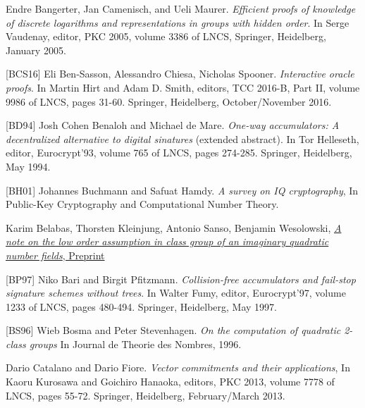 \documentclass[11pt, lettersize, notitlepage, leqno, footskip=0.6cm]{article}
\newcommand{\noin}{\noindent}
\numberwithin{equation}{section}
\begin{document}
\noin [BCM05] Endre Bangerter, Jan Camenisch, and Ueli Maurer. \textit{Efficient proofs of knowledge of discrete logarithms and representations in groups with hidden order}. In Serge Vaudenay, editor, PKC 2005, volume 3386 of LNCS, Springer, Heidelberg, January 2005.\vspace{0.1cm}

\noin \hypertarget{BCS16}{[BCS16]} Eli Ben-Sasson, Alessandro Chiesa, Nicholas Spooner. \textit{Interactive oracle proofs}. In Martin Hirt and Adam D. Smith, editors, TCC 2016-B, Part II, volume 9986 of LNCS, pages 31-60. Springer, Heidelberg,
October/November 2016.\vspace{0.1cm}

\noin \hypertarget{BD94}{[BD94]} Josh Cohen Benaloh and Michael de Mare. \textit{One-way accumulators: A decentralized alternative to digital sinatures} (extended abstract). In Tor Helleseth, editor, Eurocrypt'93, volume 765 of LNCS, pages 274-285. Springer, Heidelberg, May 1994.\vspace{0.1cm}

\noin \hypertarget{BH01}{[BH01]} Johannes Buchmann and Safuat Hamdy. \textit{A survey on IQ cryptography}, In Public-Key Cryptography and Computational Number Theory. \vspace{0.1cm}

\noin [BKSW20] Karim Belabas, Thorsten Kleinjung, Antonio Sanso, Benjamin Wesolowski, \href{https://eprint.iacr.org/2020/1310}{\textit{A note on the low order assumption in class group of an imaginary quadratic number fields}, Preprint} \vspace{0.1cm}

\noin \hypertarget{BP97}{[BP97]} Niko Bari and Birgit Pfitzmann. \textit{Collision-free accumulators and fail-stop signature schemes without trees}. In Walter Fumy, editor, Eurocrypt'97, volume 1233 of LNCS, pages 480-494. Springer, Heidelberg, May 1997. \vspace{0.1cm}

\noin \hypertarget{BS96}{[BS96]} Wieb Bosma and Peter Stevenhagen. \textit{On the computation of quadratic 2-class groups} In Journal de Theorie des Nombres, 1996. \vspace{0.1cm}

\noin [CF13] Dario Catalano and Dario Fiore. \textit{Vector commitments and their applications}, In Kaoru Kurosawa and Goichiro Hanaoka, editors, PKC 2013, volume 7778 of LNCS, pages 55-72. Springer, Heidelberg, February/March 2013. \vspace{0.1cm}
\end{document}
